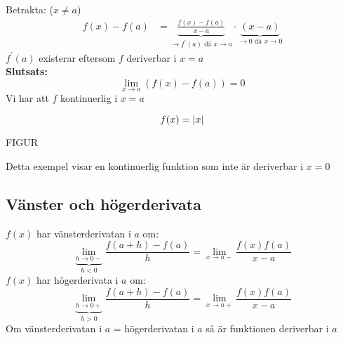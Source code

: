 \begin{bevis}
    Betrakta: ($x \neq a$)
    \begin{align*}
        f(x) - f(a) &= \underbrace{\frac{f(x) - f(a)}{x-a}}_{\to f^\prime(a) \mbox{ då } x \to a} \cdot \underbrace{(x - a)}_{\to 0 \mbox{ då } x \to 0}
    \end{align*}
    $f^\prime(a)$ existerar eftersom $f$ deriverbar i $x=a$\\
    \textbf{Slutsats:}
    \[
    \lim\limits_{x \to a}(f(x) - f(a)) = 0
    \]
    Vi har att $f$ kontinuerlig i $x=a$
\end{bevis}
\begin{Ex}
    \[
    f(x) = \lvert x\rvert
    \]
    \begin{center}
        FIGUR
    \end{center}
    Detta exempel visar en kontinuerlig funktion som inte är deriverbar i $x = 0$
\end{Ex}
\subsection{Vänster och högerderivata} %
\label{sub:v_nster_och_h_gerderivata}
$f(x)$ har vänsterderivatan i $a$ om:
\[
\underbrace{\lim\limits_{h \to 0-}}_{h < 0}\frac{f(a+h)-f(a)}{h} = \lim\limits_{x \to a-}\frac{f(x) f(a)}{x-a}
\]
$f(x)$ har högerderivata i $a$ om:
\[
\underbrace{\lim\limits_{h \to 0+}}_{h > 0}\frac{f(a+h)-f(a)}{h} = \lim\limits_{x \to a+}\frac{f(x) f(a)}{x-a}
\]
Om vänsterderivatan i $a$ = högerderivatan i $a$ så är funktionen deriverbar i $a$
